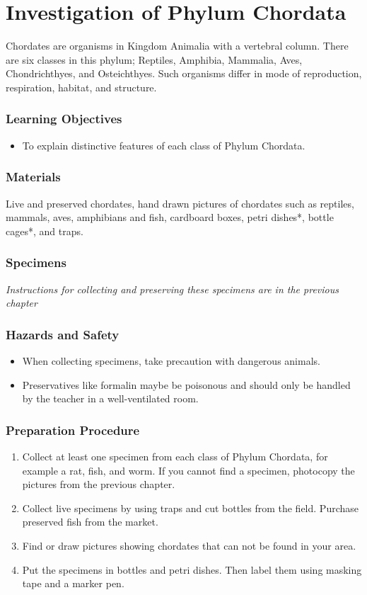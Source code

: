 \section{Investigation of Phylum Chordata}
Chordates are organisms in Kingdom Animalia with a vertebral column. There are six classes in this phylum; Reptiles, Amphibia, Mammalia, Aves, Chondrichthyes, and Osteichthyes. Such organisms differ in mode of reproduction, respiration, habitat, and structure.

\subsubsection*{Learning Objectives}
\begin{itemize}
\item{To explain distinctive features of each class of Phylum Chordata.}
\end{itemize}

\subsubsection*{Materials}
Live and preserved chordates, hand drawn pictures of chordates such as reptiles, mammals, aves, amphibians and fish, cardboard boxes, petri dishes*, bottle cages*, and traps.

\subsubsection*{Specimens}
\textit{Instructions for collecting and preserving these specimens are in the previous chapter}

\subsubsection*{Hazards and Safety}
\begin{itemize}
\item{When collecting specimens, take precaution with dangerous animals.}
\item{Preservatives like formalin maybe be poisonous and should only be handled by the teacher in a well-ventilated room.}
\end{itemize}

\subsubsection*{Preparation Procedure}
\begin{enumerate}
\item{Collect at least one specimen from each class of Phylum Chordata, for example a rat, fish, and worm. If you cannot find a specimen, photocopy the pictures from the previous chapter.}
\item{Collect live specimens by using traps and cut bottles from the field. Purchase preserved fish from the market.}
\item{Find or draw pictures showing chordates that can not be found in your area.}
\item{Put the specimens in bottles and petri dishes. Then label them using masking tape and a marker pen.}
\end{enumerate}

